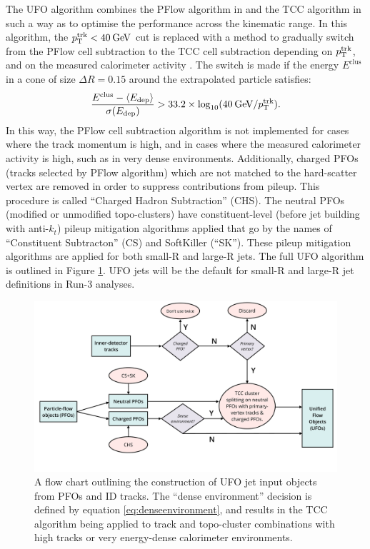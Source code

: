 The UFO algorithm combines the PFlow algorithm in \cite{Atlas:PFlow} and the TCC algorithm \cite{Atlas:TCC} in such a way as to optimise the performance across the kinematic range. In this algorithm, the $p_{\text{T}}^{\text{trk}}<40\hspace{2pt}\text{Ge\kern -0.1em V}$ cut is replaced with a method to gradually switch from the PFlow cell subtraction to the TCC cell subtraction depending on $p_{\text{T}}^{\text{trk}}$, and on the measured calorimeter activity \cite{Atlas:PFlow2}. The switch is made if the energy $E^{\text{clus}}$ in a cone of size $\Delta R=0.15$ around the extrapolated particle satisfies:
\begin{equation}
    \frac{E^{\text{clus}}-\langle E_{\text{dep}}\rangle}{\sigma(E_{\text{dep}})}>33.2\times\text{log}_{10}(40\hspace{2pt}\text{Ge\kern -0.1em V}/{p_{\text{T}}^{\text{trk}}}).
    \label{eq:denseenvironment}
\end{equation}
In this way, the PFlow cell subtraction algorithm is not implemented for cases where the track momentum is high, and in cases where the measured calorimeter activity is high, such as in very dense environments. Additionally, charged PFOs (tracks selected by PFlow algorithm) which are not matched to the hard-scatter vertex are removed in order to suppress contributions from pileup. This procedure is called ``Charged Hadron Subtraction'' (CHS). The neutral PFOs (modified or unmodified topo-clusters) have constituent-level (before jet building with anti-$k_t$) pileup mitigation algorithms applied that go by the names of ``Constituent Subtracton'' (CS) and SoftKiller (``SK''). These pileup mitigation algorithms are applied for both small-R and large-R jets. The full UFO algorithm is outlined in Figure \ref{fig:ufoalgorithm}. UFO jets will be the default for small-R and large-R jet definitions in Run-3 analyses.
\begin{figure}[t]
    \centering
    \includegraphics[width=\textwidth]{plots/atlas/ufoalgorithm.pdf}
    \caption{A flow chart outlining the construction of UFO jet input objects from PFOs and ID tracks. The ``dense environment'' decision is defined by equation \ref{eq:denseenvironment}, and results in the TCC algorithm being applied to track and topo-cluster combinations with high \pt tracks or very energy-dense calorimeter environments.\label{fig:ufoalgorithm}}
\end{figure}
